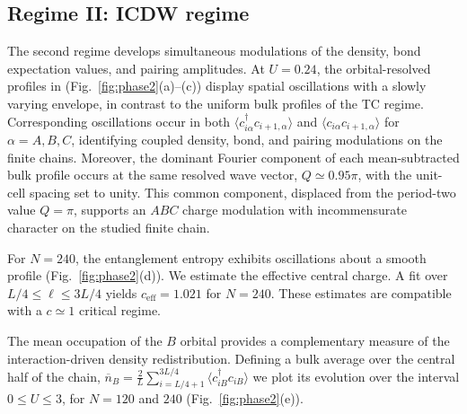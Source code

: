\documentclass[
  prb,
  reprint,
  superscriptaddress,
  amsmath,
  amssymb,
  longbibliography
]{revtex4-2}
\begin{document}
\subsection{Regime II: ICDW regime }

The second regime develops simultaneous modulations of the density,
bond expectation values, and pairing amplitudes.
At $U=0.24$, the orbital-resolved profiles in
(Fig.~\ref{fig:phase2}(a)--(c)) display spatial oscillations with a
slowly varying envelope, in contrast to the uniform bulk profiles
of the TC regime. Corresponding oscillations occur in both
$\langle c^\dagger_{i\alpha}c_{i+1,\alpha}\rangle$ and
$\langle c_{i\alpha}c_{i+1,\alpha}\rangle$ for
$\alpha=A,B,C$, identifying coupled density, bond, and pairing
modulations on the finite chains. Moreover, the dominant
Fourier component of each mean-subtracted bulk profile occurs
at the same resolved wave vector, $Q\simeq0.95\pi$, with the
unit-cell spacing set to unity. This common component,
displaced from the period-two value $Q=\pi$, supports an
$ABC$ charge modulation with incommensurate character on the
studied finite chain.

For $N=240$, the entanglement entropy exhibits
oscillations about a smooth profile (Fig.~\ref{fig:phase2}(d)).
We estimate the effective central charge. A fit over $L/4\leq\ell\leq3L/4$ yields $c_{\mathrm{eff}}=1.021$ for $N=240$.
These estimates are compatible with a $c\simeq1$ critical
regime.

The mean occupation of the $B$ orbital provides a complementary
measure of the interaction-driven density redistribution.
Defining a bulk average over the central half of the chain, $\overline{n}_B=\frac{2}{L}
\sum_{i=L/4+1}^{3L/4}\langle c^\dagger_{iB}c_{iB}\rangle$ we plot its evolution over the interval $0\leq U\leq3$, for $N=120$ and $240$
(Fig.~\ref{fig:phase2}(e)).
\end{document}
